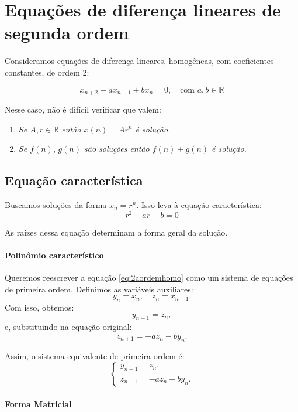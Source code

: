 \documentclass{article}
\begin{document}
\section{Equações de diferença lineares de segunda ordem}

Consideramos equações de diferença lineares, homogêneas, com coeficientes constantes, de ordem 2:

\begin{equation}\label{eq:2aordemhomo}
x_{n+2} + a x_{n+1} + b x_n = 0, \quad \text{com } a, b \in \mathbb{R}
\end{equation}

Nesse caso, não é difícil verificar que valem:
\begin{enumerate}
\item \emph{Se $A,r\in\mathbb R$ então $x(n) = A r^n$ é solução.}
\item \emph{Se $f(n),\,g(n)$ são soluções então $f(n)+g(n)$ é solução.}
\end{enumerate}


\subsection{Equação característica}

Buscamos soluções da forma $x_n = r^n$. Isso leva à equação característica:
\begin{equation}\label{eq:eqcarac} 
r^2 + a r + b = 0
\end{equation}

As raízes dessa equação determinam a forma geral da solução.

\paragraph{Polinômio característico}
Queremos reescrever a equação \eqref{eq:2aordemhomo} como um sistema de
equações de primeira ordem. Definimos as variáveis auxiliares:
\[
y_n = x_n, \quad z_n = x_{n+1}.
\]
Com isso, obtemos:
\[
y_{n+1} = z_n,
\]
e, substituindo na equação original:
\[
z_{n+1} = -a z_n - b y_n.
\]

Assim, o sistema equivalente de primeira ordem é:
\begin{equation}
\begin{cases}
y_{n+1} = z_n, \\
z_{n+1} = -a z_n - b y_n.
\end{cases}
\end{equation}

\paragraph{Forma Matricial}
\end{document}
